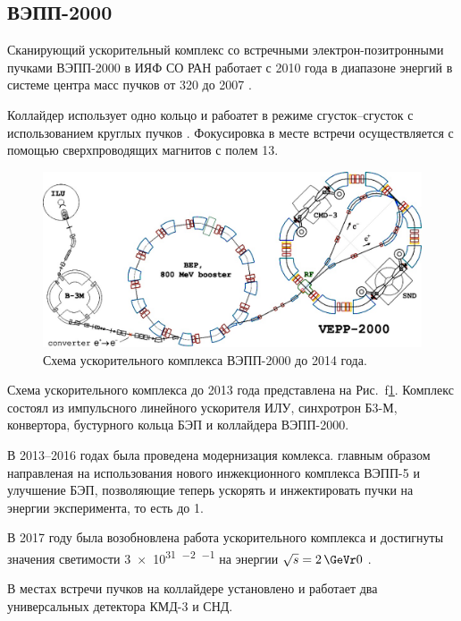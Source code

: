 \subsection{ВЭПП-2000}

Сканирующий ускорительный комплекс со встречными элек\-т\-рон-по\-зи\-т\-рон\-ны\-ми пучками ВЭПП-2000 в ИЯФ СО РАН работает с 2010 года в диапазоне энергий в системе центра масс пучков от \SI{320}{\MeVr} до \SI{2007}{\MeVr} \cite{Berkaev2012}.

Коллайдер использует одно кольцо и рабоатет в режиме сгусток--сгусток
с использованием круглых пучков \cite{Danilov:1996jw}.
Фокусировка в месте встречи осуществляется с помощью сверхпроводящих магнитов с полем \SI{13}{\teslaru}.

\begin{figure}[htbp]
    \centering
    \includegraphics[width=\textwidth]{img/vepp2knew.png}
    \caption{Схема ускорительного комплекса ВЭПП-2000 до 2014 года.}
    \label{fig:vepp2000}
\end{figure}

Схема ускорительного комплекса до 2013 года представлена на Рис.~f\ref{fig:vepp2000}.
Комплекс состоял из импульсного линейного ускорителя ИЛУ,
синхротрон Б3-М,
конвертора,
бустурного кольца БЭП
и коллайдера ВЭПП-2000.

В 2013--2016 годах была проведена модернизация комлекса.
главным образом направленая на использования нового инжекционного комплекса ВЭПП-5
и улучшение БЭП,
позволяющие теперь ускорять и инжектировать пучки на энергии эксперимента,
то есть до \SI{1}{\GeVr}.

В 2017 году была возобновлена работа ускорительного комплекса и достигнуты значения светимости
\SI{3e31}{\cmr^{-2} \sr^{-1}} на энергии $\sqrt{s} = \SI{2}{\GeVr}0$ \cite{Shatunov:2018xfm}.

В местах встречи пучков на коллайдере установлено и работает два универсальных детектора КМД-3 и СНД.





